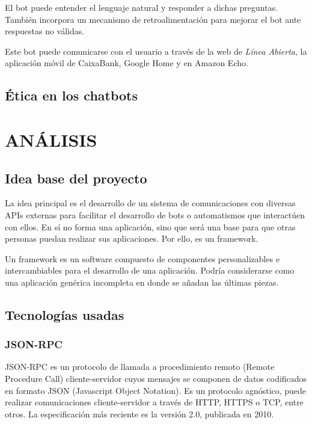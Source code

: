 \documentclass[spanish,12pt, a4paper, twoside]{paper}
\let\oldsection\section
\def\section{\cleardoublepage\oldsection}
\begin{document}
El bot puede entender el lenguaje natural y responder a dichas preguntas. También incorpora un mecanismo de retroalimentación para mejorar el bot ante respuestas no válidas.

Este bot puede comunicarse con el usuario a través de la web de \emph{Línea Abierta}, la aplicación móvil de CaixaBank, Google Home y en Amazon Echo.

\subsection{Ética en los chatbots}

\section{ANÁLISIS}

\subsection{Idea base del proyecto}

La idea principal es el desarrollo de un sistema de comunicaciones con diversas APIs externas para facilitar el desarrollo de bots o automatismos que interactúen con ellos. En sí no forma una aplicación, sino que será una base para que otras personas puedan realizar sus aplicaciones. Por ello, es un framework.
\newline

Un framework es un software compuesto de componentes personalizables e intercambiables para el desarrollo de una aplicación. Podría considerarse como una aplicación genérica incompleta en donde se añadan las últimas piezas. \cite[pág. 1]{FrameworkJJG}

\subsection{Tecnologías usadas}

\subsubsection{JSON-RPC}

JSON-RPC es un protocolo de llamada a procedimiento remoto (Remote Procedure Call) cliente-servidor cuyos mensajes se componen de datos codificados en formato JSON (Javascript Object Notation). Es un protocolo agnóstico, puede realizar comunicaciones cliente-servidor a través de HTTP, HTTPS o TCP, entre otros. La especificación más reciente es la versión 2.0, publicada en 2010.
\end{document}

